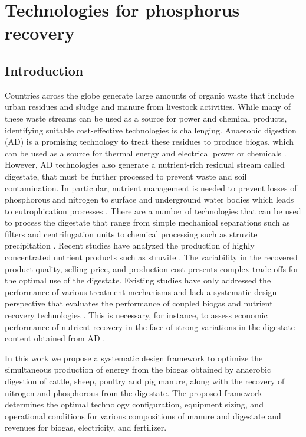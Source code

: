 \chapter{Technologies for phosphorus recovery}\label{ch:PhosphorusTechs}
\begin{refsection}[referencesCh2]
\section{Introduction}
Countries across the globe generate large amounts of organic waste that include urban residues and sludge and manure from livestock activities. While many of these waste streams can be used as a source for power and chemical products, identifying suitable cost-effective technologies
is challenging. Anaerobic digestion (AD) is a promising technology to treat these residues to produce biogas, which can be used as a source for thermal energy and electrical power \citep{Leon} or chemicals \citep{hernandez2016optimal}. However, AD technologies also generate a nutrient-rich residual stream called digestate, that must be further processed to prevent waste and soil contamination. In particular, nutrient management is needed to prevent losses of phosphorous and nitrogen to surface and underground water bodies which leads to eutrophication processes \citep{Sampat2017, GarciaSerrano}. There are a number of technologies that can be used to process the digestate that range from simple mechanical separations such as filters \citep{gustafsson2008phosphate} and centrifugation units \citep{meixner2015effect} to chemical processing such as struvite precipitation \citep{bhuiyan2008phosphorus}. Recent studies have analyzed the production of highly concentrated nutrient products such as struvite \citep{lin2015phosphorus}. The variability in the recovered product quality, selling price, and production cost presents complex trade-offs for the optimal use of the digestate. Existing studies have only addressed the performance of various treatment mechanisms and lack a systematic design perspective that evaluates the performance of coupled biogas and nutrient recovery technologies \citep{drosg2015nutrient}. This is necessary, for instance, to assess economic performance of nutrient recovery in the face of strong variations in the digestate content obtained from AD \citep{AlSeadi2008}.

In this work we propose a systematic design framework to optimize the simultaneous production of energy from the biogas obtained by anaerobic digestion of cattle, sheep, poultry and pig manure, along with the recovery of nitrogen and phosphorous from the digestate. The proposed framework determines the optimal technology configuration, equipment sizing, and operational conditions for various compositions of manure and digestate and revenues for biogas, electricity, and fertilizer. 


\end{refsection}
